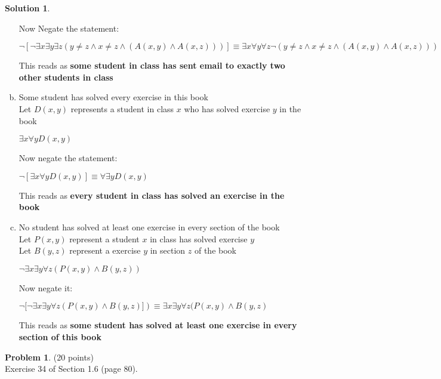 \documentclass{article}
\theoremstyle{definition}
\newtheorem{problem}{Problem}
\newtheorem*{solution}{Solution}
\begin{document}
\begin{solution}
\begin{enumerate}[a)]
      Now Negate the statement:

      $\neg [\neg \exists x \exists y \exists z ( y \neq z \wedge x \neq z \wedge ( A(x,y) \wedge A(x,z))) ] \equiv
          \exists x \forall y \forall z \neg(y \neq z \wedge x \neq z \wedge ( A(x,y) \wedge A(x,z)))$

      This reads as \textbf{some student in class has sent email to exactly two other students in class}

\item Some student has solved every exercise in this book \\
      Let $D(x,y)$ represents a student in class $x$ who has solved exercise $y$ in the book

      $\exists x \forall y D(x,y)$

      Now negate the statement:

      $\neg [\exists x \forall y D(x,y)] \equiv \forall \exists y D(x,y)$

      This reads as \textbf{every student in class has solved an exercise in the book}

\item No student has solved at least one exercise in every section of the book \\
      Let $P(x,y)$ represent a student $x$ in class has solved exercise $y$ \\
      Let $B(y,z)$ represent a exercise $y$ in section $z$ of the book

      $\neg \exists x \exists y \forall z ( P(x,y) \wedge B(y,z) )  $

      Now negate it:

      $\neg [ \neg \exists x \exists y \forall z ( P(x,y) \wedge B(y,z) ]) \equiv
          \exists x \exists y \forall z ( P(x,y) \wedge B(y,z)$

      This reads as \textbf{some student has solved at least one exercise in every section of this book}

\end{enumerate}
\end{solution}

\newpage

\begin{problem} (20 points)\\
Exercise 34 of Section 1.6 (page 80).
\end{problem}
\end{document}
